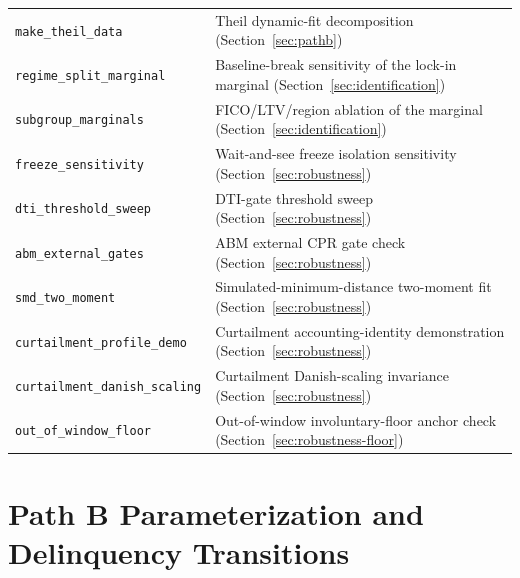 \documentclass[12pt]{article}
\begin{document}
\begin{table}[H]
\begin{threeparttable}
\begin{tabular}{@{}p{5.4cm}p{8.8cm}@{}}
\texttt{make\_theil\_data} & Theil dynamic-fit decomposition (Section~\ref{sec:pathb}) \\
\texttt{regime\_split\_marginal} & Baseline-break sensitivity of the lock-in marginal (Section~\ref{sec:identification}) \\
\texttt{subgroup\_marginals} & FICO/LTV/region ablation of the marginal (Section~\ref{sec:identification}) \\
\texttt{freeze\_sensitivity} & Wait-and-see freeze isolation sensitivity (Section~\ref{sec:robustness}) \\
\texttt{dti\_threshold\_sweep} & DTI-gate threshold sweep (Section~\ref{sec:robustness}) \\
\texttt{abm\_external\_gates} & ABM external CPR gate check (Section~\ref{sec:robustness}) \\
\texttt{smd\_two\_moment} & Simulated-minimum-distance two-moment fit (Section~\ref{sec:robustness}) \\
\texttt{curtailment\_profile\_demo} & Curtailment accounting-identity demonstration (Section~\ref{sec:robustness}) \\
\texttt{curtailment\_danish\_scaling} & Curtailment Danish-scaling invariance (Section~\ref{sec:robustness}) \\
\texttt{out\_of\_window\_floor} & Out-of-window involuntary-floor anchor check (Section~\ref{sec:robustness-floor}) \\
\bottomrule
\end{tabular}
\end{threeparttable}
\end{table}

\section{Path B Parameterization and Delinquency Transitions}\label{app:params}
\end{document}
